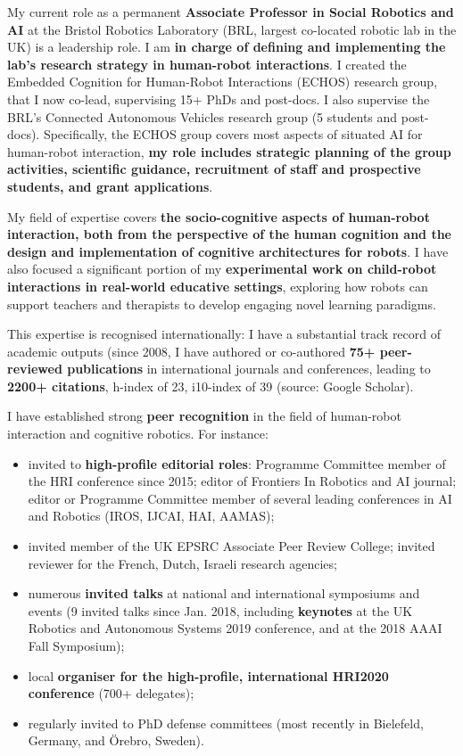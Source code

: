 \documentclass[11pt,a4paper]{report}
\begin{document}
My current role as a permanent \textbf{Associate Professor in Social Robotics
and AI} at the Bristol Robotics Laboratory (BRL, largest co-located robotic lab
in the UK) is a leadership role. I am \textbf{in charge of defining and
implementing the lab's research strategy in human-robot interactions}. I created
the Embedded Cognition for Human-Robot Interactions (ECHOS) research group, that
I now co-lead, supervising 15+ PhDs and post-docs. I also supervise the BRL's
Connected Autonomous Vehicles research group (5 students and post-docs).
Specifically, the ECHOS group covers most aspects of situated AI for human-robot
interaction, \textbf{my role includes strategic planning of the group
activities, scientific guidance, recruitment of staff and prospective students,
and grant applications}.

My field of expertise covers \textbf{the socio-cognitive aspects of
human-robot interaction, both from the perspective of the human cognition and
the design and implementation of cognitive architectures for robots}. I have
also focused a significant portion of my \textbf{experimental work on
child-robot interactions in real-world educative settings}, exploring how robots
can support teachers and therapists to develop engaging novel
learning paradigms.

This expertise is recognised internationally: I have a substantial track record
of academic outputs (since 2008, I have authored or co-authored \textbf{75+ peer-reviewed
publications} in international journals and conferences, leading to \textbf{2200+
citations}, h-index of 23, i10-index of 39 (source: Google Scholar).

I have established strong \textbf{peer recognition} in the field of human-robot interaction
and cognitive robotics. For instance:

\begin{itemize}[noitemsep,topsep=0pt,parsep=0pt,partopsep=0pt]
    \item invited to \textbf{high-profile editorial roles}: Programme Committee member of the HRI
conference since 2015; editor of Frontiers In Robotics and AI journal; editor or
Programme Committee member of several leading conferences in AI and Robotics (IROS, IJCAI, HAI, AAMAS);
    \item invited member of the UK EPSRC Associate Peer Review College;
        invited reviewer for the French, Dutch, Israeli research agencies;
    \item numerous \textbf{invited talks} at national and international symposiums and
        events (9 invited talks since Jan. 2018, including \textbf{keynotes} at the UK Robotics
and Autonomous Systems 2019 conference, and at the 2018 AAAI Fall Symposium);
    \item local \textbf{organiser for the high-profile, international HRI2020
        conference} (700+ delegates);
    \item regularly invited to PhD defense committees (most recently in
        Bielefeld, Germany, and Örebro, Sweden).
\end{itemize}
\end{document}
